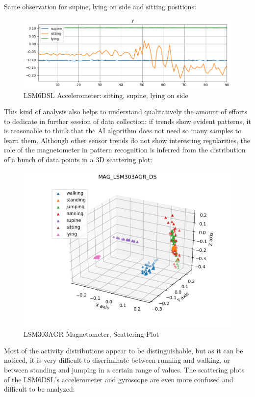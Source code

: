 Same observation for supine, lying on side and sitting positions:
\begin{figure}[H]
	\hfill\includegraphics[scale=0.8]{figures/plot_ACC_LSM303AGR_DS_supine_sitting_lying_Y.png}\hspace*{\fill}
	\caption{LSM6DSL Accelerometer: sitting, supine, lying on side}\label{fig:11}
	\centering
\end{figure} 
This kind of analysis also helps to understand qualitatively the amount of efforts to dedicate in further session of data collection: if trends show evident patterns, it is reasonable to think that the AI algorithm does not need so many samples to learn them. Although other sensor trends do not show interesting regularities, the role of the magnetometer in pattern recognition is inferred from the distribution of a bunch of data points in a 3D scattering plot:
\begin{figure}[H]
	\hfill\includegraphics[scale=0.8]{figures/scatter3d_MAG_LSM303AGR_DS.png}\hspace*{\fill}
	\caption{LSM303AGR Magnetometer, Scattering Plot }\label{fig:12}
	\centering
\end{figure}
Most of the activity distributions appear to be distinguishable, but as it can be noticed, it is very difficult to discriminate between running and walking, or between standing and jumping in a certain range of values. The scattering plots of the LSM6DSL's accelerometer and gyroscope are even more confused and difficult to be analyzed:
